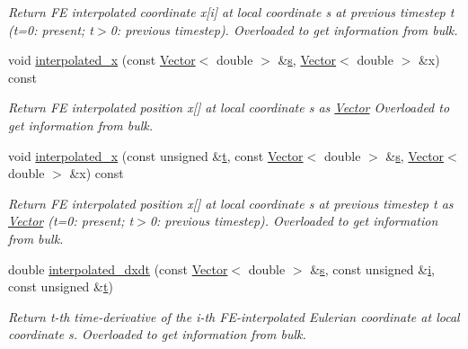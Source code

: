 \begin{DoxyCompactItemize}
\begin{DoxyCompactList}\small\item\em Return FE interpolated coordinate x\mbox{[}i\mbox{]} at local coordinate s at previous timestep t (t=0\+: present; t$>$0\+: previous timestep). Overloaded to get information from bulk. \end{DoxyCompactList}\item 
void \hyperlink{classoomph_1_1FaceElement_a01b07e01c23777ed539a6b6d37f069ee}{interpolated\+\_\+x} (const \hyperlink{classoomph_1_1Vector}{Vector}$<$ double $>$ \&\hyperlink{cfortran_8h_ab7123126e4885ef647dd9c6e3807a21c}{s}, \hyperlink{classoomph_1_1Vector}{Vector}$<$ double $>$ \&x) const
\begin{DoxyCompactList}\small\item\em Return FE interpolated position x\mbox{[}\mbox{]} at local coordinate s as \hyperlink{classoomph_1_1Vector}{Vector} Overloaded to get information from bulk. \end{DoxyCompactList}\item 
void \hyperlink{classoomph_1_1FaceElement_a73520230d5b6cabea8ae25ad4b762f12}{interpolated\+\_\+x} (const unsigned \&\hyperlink{cfortran_8h_af6f0bd3dc13317f895c91323c25c2b8f}{t}, const \hyperlink{classoomph_1_1Vector}{Vector}$<$ double $>$ \&\hyperlink{cfortran_8h_ab7123126e4885ef647dd9c6e3807a21c}{s}, \hyperlink{classoomph_1_1Vector}{Vector}$<$ double $>$ \&x) const
\begin{DoxyCompactList}\small\item\em Return FE interpolated position x\mbox{[}\mbox{]} at local coordinate s at previous timestep t as \hyperlink{classoomph_1_1Vector}{Vector} (t=0\+: present; t$>$0\+: previous timestep). Overloaded to get information from bulk. \end{DoxyCompactList}\item 
double \hyperlink{classoomph_1_1FaceElement_a0bd0b6164be27b3e959de84c609ca0ff}{interpolated\+\_\+dxdt} (const \hyperlink{classoomph_1_1Vector}{Vector}$<$ double $>$ \&\hyperlink{cfortran_8h_ab7123126e4885ef647dd9c6e3807a21c}{s}, const unsigned \&\hyperlink{cfortran_8h_adb50e893b86b3e55e751a42eab3cba82}{i}, const unsigned \&\hyperlink{cfortran_8h_af6f0bd3dc13317f895c91323c25c2b8f}{t})
\begin{DoxyCompactList}\small\item\em Return t-\/th time-\/derivative of the i-\/th F\+E-\/interpolated Eulerian coordinate at local coordinate s. Overloaded to get information from bulk. \end{DoxyCompactList}\item 

\end{DoxyCompactItemize}

